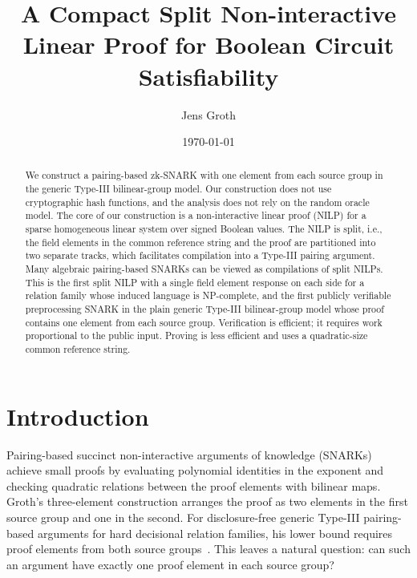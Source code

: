 \documentclass[11pt]{article}
\title{A Compact Split Non-interactive Linear Proof
for Boolean Circuit Satisfiability}
\author{Jens Groth}
\date{\today}
\theoremstyle{definition}
\begin{document}
\maketitle

\begin{abstract}
We construct a pairing-based zk-SNARK with one element from each source group in the generic Type-III bilinear-group model. Our construction does not use cryptographic hash functions, and the analysis does not rely on the random oracle model. The core of our construction is a non-interactive linear proof (NILP) for a sparse homogeneous linear system over signed Boolean values. The NILP is split, i.e., the field elements in the common reference string and the proof are partitioned into two separate tracks, which facilitates compilation into a Type-III pairing argument. Many algebraic pairing-based SNARKs can be viewed as compilations of split NILPs. This is the first split NILP with a single field element response on each side for a relation family whose induced language is NP-complete, and the first publicly verifiable preprocessing SNARK in the plain generic Type-III bilinear-group model whose proof contains one element from each source group. Verification is efficient; it requires work proportional to the public input. Proving is less efficient and uses a quadratic-size common reference string.
\end{abstract}

\section{Introduction}

Pairing-based succinct non-interactive arguments of knowledge (SNARKs) achieve small proofs by evaluating
polynomial identities in the exponent and checking quadratic relations between the proof elements with bilinear maps.
Groth's three-element construction arranges the
proof as two elements in the first source group and one in the second.  For
disclosure-free generic Type-III pairing-based arguments for hard decisional relation families, his lower bound requires proof elements from both source groups~\cite{Groth16}. This leaves a natural question: can such an argument have exactly one proof element in each source group?
\end{document}

